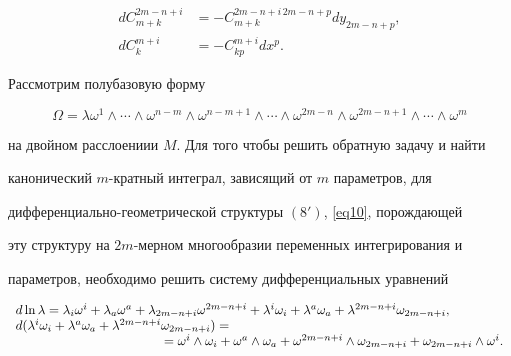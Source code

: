 \begin{equation}


\label{eq10}


\begin{split}


dC^{2m-n+i}_{m+k}&=-C^{2m-n+i\, 2m-n+p}_{m+k} dy_{2m-n+p},\\


dC^{m+i}_k &=-C^{m+i}_{kp} dx^p.


\end{split}


\end{equation}


Рассмотрим полубазовую форму


$$


\Omega=\lambda \omega^1\wedge \dotsb \wedge \omega^{n-m}\wedge


\omega^{n-m+1}\wedge \dotsb \wedge \omega^{2m-n}\wedge \omega^{2m-


n+1}\wedge \dotsb \wedge \omega^m


$$


на двойном расслоениии $M$. Для того чтобы решить обратную задачу и найти


канонический $m$-кратный интеграл, зависящий от $m$ параметров, для


дифференциально-геометрической структуры $(8')$, \eqref{eq10}, порождающей 


эту структуру на $2m$-мерном многообразии переменных интегрирования и 


параметров, необходимо решить систему дифференциальных уравнений


\begin{equation}


\label{eq_ar_12}


\begin{array}{l}  %


d\ln\lambda =\lambda_i \omega^i+\lambda_a \omega^a + \lambda_{2m-n+i}


\omega^{2m-n+i}+ \lambda^i \omega_i + \lambda^a \omega_a + \lambda^{2m-


n+i} \omega_{2m-n+i},\\


d(\lambda^i \omega_i+ \lambda^a \omega_a + \lambda^{2m-n+i}


\omega_{2m-n+i})=\\ \hspace{40mm} =\omega^i\wedge \omega_i + \omega^a\wedge


\omega_a + \omega^{2m-n+i}\wedge \omega_{2m-n+i} +\omega_{2m-


n+i}\wedge \omega^i .


\end{array}


\end{equation}


